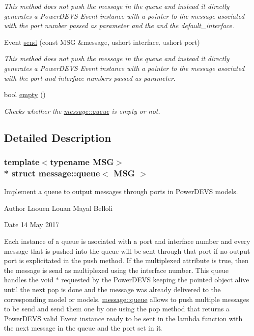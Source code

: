 \begin{DoxyCompactItemize}
\begin{DoxyCompactList}\small\item\em This method does not push the message in the queue and instead it directly generates a Power\+D\+E\+VS Event instance with a pointer to the message asociated with the port number passed as parameter and the and the default\+\_\+interface. \end{DoxyCompactList}\item 
Event \hyperlink{classmessage_1_1queue_a95abcec7e979fbc1233204c5d87865b1}{send} (const M\+SG \&message, ushort interface, ushort port)
\begin{DoxyCompactList}\small\item\em This method does not push the message in the queue and instead it directly generates a Power\+D\+E\+VS Event instance with a pointer to the message asociated with the port and interface numbers passed as parameter. \end{DoxyCompactList}\item 
bool \hyperlink{classmessage_1_1queue_ab03011f8c323c553b3f8b6d5c84ae9db}{empty} ()
\begin{DoxyCompactList}\small\item\em Checks whether the \hyperlink{classmessage_1_1queue}{message\+::queue} is empty or not. \end{DoxyCompactList}\end{DoxyCompactItemize}


\subsection{Detailed Description}
\subsubsection*{template$<$typename M\+SG$>$\\*
struct message\+::queue$<$ M\+S\+G $>$}

Implement a queue to output messages through ports in Power\+D\+E\+VS models. 

\begin{DoxyAuthor}{Author}
Laouen Louan Mayal Belloli 
\end{DoxyAuthor}
\begin{DoxyDate}{Date}
14 May 2017
\end{DoxyDate}
Each instance of a queue is asociated with a port and interface number and every message that is pushed into the queue will be sent through that port if no output port is explicitated in the push method. If the multiplexed attribute is true, then the message is send as multiplexed using the interface number. This queue handles the void $\ast$ requested by the Power\+D\+E\+VS keeping the pointed object alive until the next pop is done and the message was already delivered to the corresponding model or models. \hyperlink{classmessage_1_1queue}{message\+::queue} allows to push multiple messages to be send and send them one by one using the pop method that returns a Power\+D\+E\+VS valid Event instance ready to be sent in the lambda function with the next message in the queue and the port set in it.


